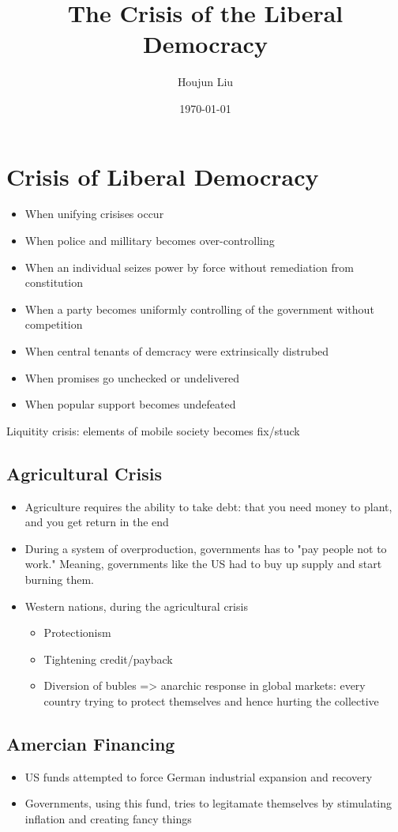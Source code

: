 \documentclass[letterpaper]{article}
\author{Houjun Liu}
\date{\today}
\title{The Crisis of the Liberal Democracy}
\renewcommand{\tableofcontents}{}
\begin{document}
\tableofcontents



\section{Crisis of Liberal Democracy}
\label{sec:org298e05d}
\begin{itemize}
\item When unifying crisises occur
\item When police and millitary becomes over-controlling
\item When an individual seizes power by force without remediation from
constitution
\item When a party becomes uniformly controlling of the government without
competition
\item When central tenants of demcracy were extrinsically distrubed
\item When promises go unchecked or undelivered
\item When popular support becomes undefeated
\end{itemize}

Liquitity crisis: elements of mobile society becomes fix/stuck

\subsection{Agricultural Crisis}
\label{sec:org35c6a8b}
\begin{itemize}
\item Agriculture requires the ability to take debt: that you need money to
plant, and you get return in the end
\item During a system of overproduction, governments has to "pay people not
to work." Meaning, governments like the US had to buy up supply and
start burning them.
\item Western nations, during the agricultural crisis

\begin{itemize}
\item Protectionism
\item Tightening credit/payback
\item Diversion of bubles => anarchic response in global markets: every
country trying to protect themselves and hence hurting the
collective
\end{itemize}
\end{itemize}

\subsection{Amercian Financing}
\label{sec:org6179947}
\begin{itemize}
\item US funds attempted to force German industrial expansion and recovery
\item Governments, using this fund, tries to legitamate themselves by
stimulating inflation and creating fancy things
\end{itemize}
\end{document}
